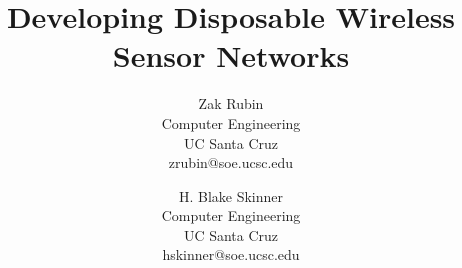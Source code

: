 \documentclass[12pt,twocolumn]{article}
\begin{document}
\begin{multicols}{2}
\title{Developing Disposable Wireless Sensor Networks}
\author{
    Zak Rubin  \\
    Computer Engineering \\
    UC Santa Cruz \\
    zrubin@soe.ucsc.edu \\
  \and
    H. Blake Skinner \\
    Computer Engineering \\
    UC Santa Cruz \\
    hskinner@soe.ucsc.edu
}
\maketitle
\end{multicols}
\end{document}

